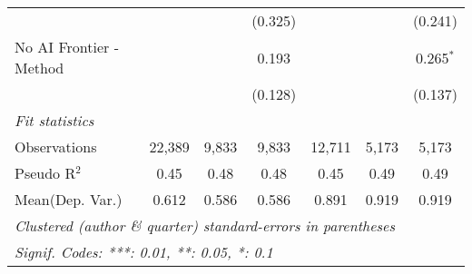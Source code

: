 \begin{tabular}{lcccccc}
                           &               &               & (0.325)      &               &               & (0.241)\\   
   No AI Frontier - Method &               &               & 0.193        &               &               & 0.265$^{*}$\\   
                           &               &               & (0.128)      &               &               & (0.137)\\   
   \midrule
   \emph{Fit statistics}\\
   Observations            & 22,389        & 9,833         & 9,833        & 12,711        & 5,173         & 5,173\\  
   Pseudo R$^2$            & 0.45          & 0.48          & 0.48         & 0.45          & 0.49          & 0.49\\  
Mean(Dep. Var.) & 0.612 & 0.586 & 0.586 & 0.891 & 0.919 & 0.919 \\
   \midrule \midrule
   \multicolumn{7}{l}{\emph{Clustered (author \& quarter) standard-errors in parentheses}}\\
   \multicolumn{7}{l}{\emph{Signif. Codes: ***: 0.01, **: 0.05, *: 0.1}}\\
\end{tabular}
\par\endgroup
